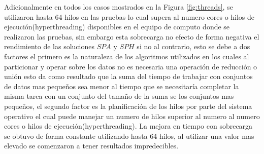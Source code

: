 Adicionalmente en todos los casos mostrados en la Figura \ref{fig:threads}, se utilizaron hasta 64 hilos en las pruebas lo cual supera al numero cores o hilos de ejecución(hyperthreading) disponibles en el equipo de computo donde se realizaron las pruebas, sin embargo esta sobrecarga no efecto de forma negativa el rendimiento de las soluciones $SPA$ y $SPH$ si no al contrario, esto se debe a dos factores el primero es la naturaleza de los algoritmos utilizados en los cuales al particionar y operar sobre los datos no es necesaria una operación de reducción o unión esto da como resultado que la suma del tiempo de trabajar con conjuntos de datos mas pequeños sea menor al tiempo que se necesitaría completar la misma tarea con un conjunto del tamaño de la suma se los conjuntos mas pequeños, el segundo factor es la planificación de los hilos por parte del sistema operativo el cual puede manejar un numero de hilos superior al numero al numero cores o hilos de ejecución(hyperthreading). La mejora en tiempo con sobrecarga se obtuvo de forma constante utilizando hasta 64 hilos, al utilizar una valor mas elevado se comenzaron a tener resultados impredecibles.\\
\vfill
\pagebreak
\begingroup
\setlength{\parindent}{0cm}
